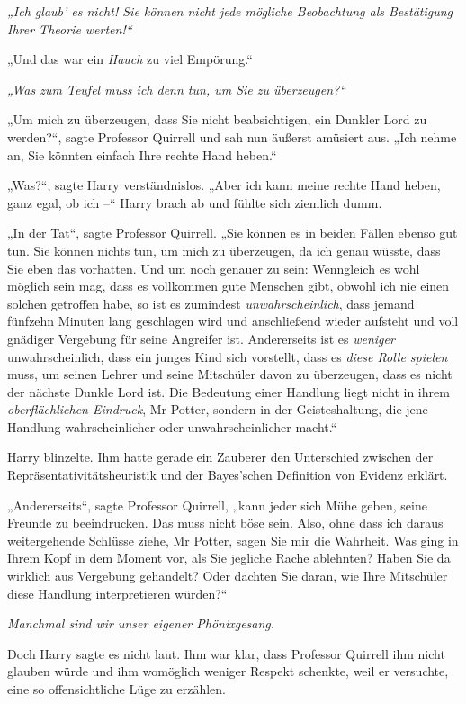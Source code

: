 {\emph{„Ich glaub' es nicht! Sie können nicht jede mögliche Beobachtung als Bestätigung Ihrer Theorie werten!“}

„Und das war ein \emph{Hauch} zu viel Empörung.“

\emph{„Was zum Teufel muss ich denn tun, um Sie zu überzeugen?“}

„Um mich zu überzeugen, dass Sie nicht beabsichtigen, ein Dunkler Lord zu werden?“, sagte Professor Quirrell und sah nun äußerst amüsiert aus. „Ich nehme an, Sie könnten einfach Ihre rechte Hand heben.“

„Was?“, sagte Harry verständnislos. „Aber ich kann meine rechte Hand heben, ganz egal, ob ich --“ Harry brach ab und fühlte sich ziemlich dumm.

„In der Tat“, sagte Professor Quirrell. „Sie können es in beiden Fällen ebenso gut tun. Sie können nichts tun, um mich zu überzeugen, da ich genau wüsste, dass Sie eben das vorhatten. Und um noch genauer zu sein: Wenngleich es wohl möglich sein mag, dass es vollkommen gute Menschen gibt, obwohl ich nie einen solchen getroffen habe, so ist es zumindest \emph{unwahrscheinlich}, dass jemand fünfzehn Minuten lang geschlagen wird und anschließend wieder aufsteht und voll gnädiger Vergebung für seine Angreifer ist. Andererseits ist es \emph{weniger} unwahrscheinlich, dass ein junges Kind sich vorstellt, dass es \emph{diese Rolle spielen} muss, um seinen Lehrer und seine Mitschüler davon zu überzeugen, dass es nicht der nächste Dunkle Lord ist. Die Bedeutung einer Handlung liegt nicht in ihrem \emph{oberflächlichen Eindruck}, Mr Potter, sondern in der Geisteshaltung, die jene Handlung wahrscheinlicher oder unwahrscheinlicher macht.“

Harry blinzelte. Ihm hatte gerade ein Zauberer den Unterschied zwischen der Repräsentativitätsheuristik und der Bayes'schen Definition von Evidenz erklärt.

„Andererseits“, sagte Professor Quirrell, „kann jeder sich Mühe geben, seine Freunde zu beeindrucken. Das muss nicht böse sein. Also, ohne dass ich daraus weitergehende Schlüsse ziehe, Mr Potter, sagen Sie mir die Wahrheit. Was ging in Ihrem Kopf in dem Moment vor, als Sie jegliche Rache ablehnten? Haben Sie da wirklich aus Vergebung gehandelt? Oder dachten Sie daran, wie Ihre Mitschüler diese Handlung interpretieren würden?“

\emph{Manchmal sind wir unser eigener Phönixgesang.}

Doch Harry sagte es nicht laut. Ihm war klar, dass Professor Quirrell ihm nicht glauben würde und ihm womöglich weniger Respekt schenkte, weil er versuchte, eine so offensichtliche Lüge zu erzählen.

}
